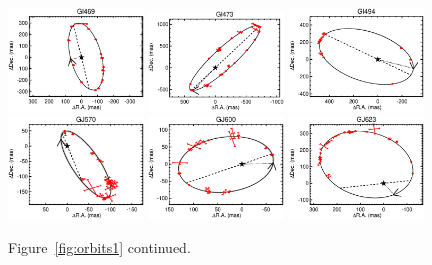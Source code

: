 \documentclass[twocolumn]{aastex62}
\begin{document}
\begin{figure}[htp]
\begin{center}
\includegraphics[width=0.32\textwidth]{Orbits/Gl469AB.eps}
\includegraphics[width=0.32\textwidth]{Orbits/Gl473AB.eps}
\includegraphics[width=0.32\textwidth]{Orbits/Gl494AB.eps}
\includegraphics[width=0.32\textwidth]{Orbits/GJ570AB.eps}
\includegraphics[width=0.32\textwidth]{Orbits/GJ600AB.eps}
\includegraphics[width=0.32\textwidth]{Orbits/GJ623AB.eps}
\caption{Figure~\ref{fig:orbits1} continued.}
\label{fig:orbits3}
\end{center}
\end{figure}
\end{document}
